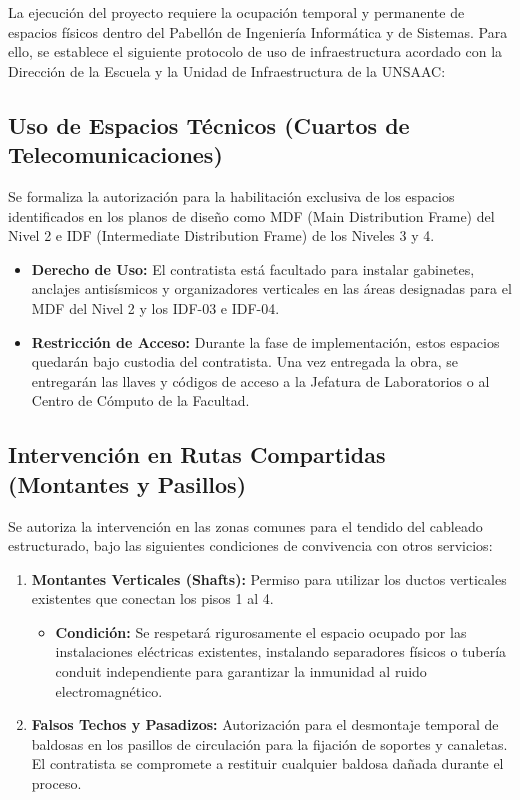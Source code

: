 La ejecución del proyecto requiere la ocupación temporal y permanente de espacios físicos dentro del Pabellón de Ingeniería Informática y de Sistemas. Para ello, se establece el siguiente protocolo de uso de infraestructura acordado con la Dirección de la Escuela y la Unidad de Infraestructura de la UNSAAC:

\subsection*{Uso de Espacios Técnicos (Cuartos de Telecomunicaciones)}

Se formaliza la autorización para la habilitación exclusiva de los espacios identificados en los planos de diseño como MDF (Main Distribution Frame) del Nivel 2 e IDF (Intermediate Distribution Frame) de los Niveles 3 y 4.

\begin{itemize}
    \item \textbf{Derecho de Uso:} El contratista está facultado para instalar gabinetes, anclajes antisísmicos y organizadores verticales en las áreas designadas para el MDF del Nivel 2 y los IDF-03 e IDF-04.
    \item \textbf{Restricción de Acceso:} Durante la fase de implementación, estos espacios quedarán bajo custodia del contratista. Una vez entregada la obra, se entregarán las llaves y códigos de acceso a la Jefatura de Laboratorios o al Centro de Cómputo de la Facultad.
\end{itemize}

\subsection*{Intervención en Rutas Compartidas (Montantes y Pasillos)}

Se autoriza la intervención en las zonas comunes para el tendido del cableado estructurado, bajo las siguientes condiciones de convivencia con otros servicios:

\begin{enumerate}
    \item \textbf{Montantes Verticales (Shafts):} Permiso para utilizar los ductos verticales existentes que conectan los pisos 1 al 4.
    \begin{itemize}
        \item \textbf{Condición:} Se respetará rigurosamente el espacio ocupado por las instalaciones eléctricas existentes, instalando separadores físicos o tubería conduit independiente para garantizar la inmunidad al ruido electromagnético.
    \end{itemize}
    \item \textbf{Falsos Techos y Pasadizos:} Autorización para el desmontaje temporal de baldosas en los pasillos de circulación para la fijación de soportes y canaletas. El contratista se compromete a restituir cualquier baldosa dañada durante el proceso.
\end{enumerate}

